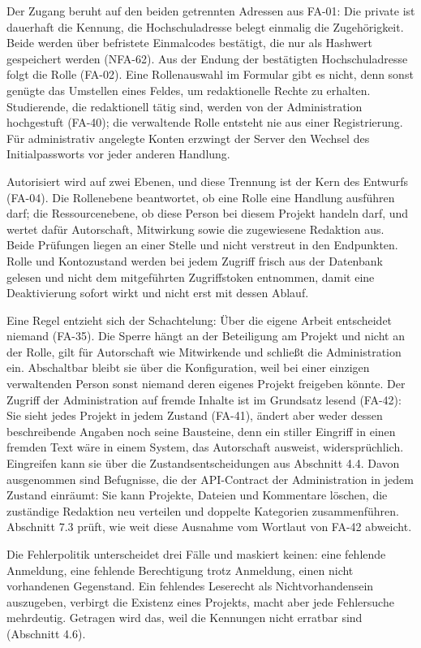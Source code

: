 Der Zugang beruht auf den beiden getrennten Adressen aus FA-01: Die private ist dauerhaft die Kennung, die Hochschuladresse belegt einmalig die Zugehörigkeit. Beide werden über befristete Einmalcodes bestätigt, die nur als Hashwert gespeichert werden (NFA-62). Aus der Endung der bestätigten Hochschuladresse folgt die Rolle (FA-02). Eine Rollenauswahl im Formular gibt es nicht, denn sonst genügte das Umstellen eines Feldes, um redaktionelle Rechte zu erhalten. Studierende, die redaktionell tätig sind, werden von der Administration hochgestuft (FA-40); die verwaltende Rolle entsteht nie aus einer Registrierung. Für administrativ angelegte Konten erzwingt der Server den Wechsel des Initialpassworts vor jeder anderen Handlung.

Autorisiert wird auf zwei Ebenen, und diese Trennung ist der Kern des Entwurfs (FA-04). Die Rollenebene beantwortet, ob eine Rolle eine Handlung ausführen darf; die Ressourcenebene, ob diese Person bei diesem Projekt handeln darf, und wertet dafür Autorschaft, Mitwirkung sowie die zugewiesene Redaktion aus. Beide Prüfungen liegen an einer Stelle und nicht verstreut in den Endpunkten. Rolle und Kontozustand werden bei jedem Zugriff frisch aus der Datenbank gelesen und nicht dem mitgeführten Zugriffstoken entnommen, damit eine Deaktivierung sofort wirkt und nicht erst mit dessen Ablauf.

Eine Regel entzieht sich der Schachtelung: Über die eigene Arbeit entscheidet niemand (FA-35). Die Sperre hängt an der Beteiligung am Projekt und nicht an der Rolle, gilt für Autorschaft wie Mitwirkende und schließt die Administration ein. Abschaltbar bleibt sie über die Konfiguration, weil bei einer einzigen verwaltenden Person sonst niemand deren eigenes Projekt freigeben könnte. Der Zugriff der Administration auf fremde Inhalte ist im Grundsatz lesend (FA-42): Sie sieht jedes Projekt in jedem Zustand (FA-41), ändert aber weder dessen beschreibende Angaben noch seine Bausteine, denn ein stiller Eingriff in einen fremden Text wäre in einem System, das Autorschaft ausweist, widersprüchlich. Eingreifen kann sie über die Zustandsentscheidungen aus Abschnitt 4.4. Davon ausgenommen sind Befugnisse, die der API-Contract der Administration in jedem Zustand einräumt: Sie kann Projekte, Dateien und Kommentare löschen, die zuständige Redaktion neu verteilen und doppelte Kategorien zusammenführen. Abschnitt 7.3 prüft, wie weit diese Ausnahme vom Wortlaut von FA-42 abweicht.

Die Fehlerpolitik unterscheidet drei Fälle und maskiert keinen: eine fehlende Anmeldung, eine fehlende Berechtigung trotz Anmeldung, einen nicht vorhandenen Gegenstand. Ein fehlendes Leserecht als Nichtvorhandensein auszugeben, verbirgt die Existenz eines Projekts, macht aber jede Fehlersuche mehrdeutig. Getragen wird das, weil die Kennungen nicht erratbar sind (Abschnitt 4.6).

